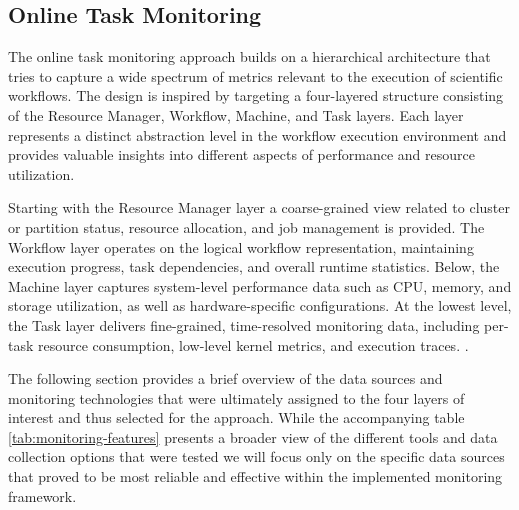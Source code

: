 \subsection{Online Task Monitoring}
\label{sec:online_task_monitoring}

The online task monitoring approach builds on a hierarchical architecture that tries to capture a wide spectrum of metrics relevant to the execution of scientific workflows. The design is inspired by \cite{Bader_2022} targeting a four-layered structure consisting of the Resource Manager, Workflow, Machine, and Task layers. Each layer represents a distinct abstraction level in the workflow execution environment and provides valuable insights into different aspects of performance and resource utilization.

Starting with the Resource Manager layer a coarse-grained view related to cluster or partition status, resource allocation, and job management is provided. The Workflow layer operates on the logical workflow representation, maintaining execution progress, task dependencies, and overall runtime statistics. Below, the Machine layer captures system-level performance data such as CPU, memory, and storage utilization, as well as hardware-specific configurations. At the lowest level, the Task layer delivers fine-grained, time-resolved monitoring data, including per-task resource consumption, low-level kernel metrics, and execution traces.
\cite{Bader_2022}.

The following section provides a brief overview of the data sources and monitoring technologies that were ultimately assigned to the four layers of interest and thus selected for the approach. While the accompanying table \ref{tab:monitoring-features} presents a broader view of the different tools and data collection options that were tested we will focus only on the specific data sources that proved to be most reliable and effective within the implemented monitoring framework.

